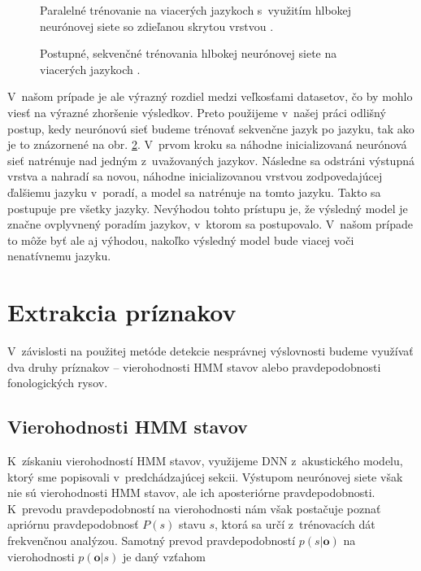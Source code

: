 \begin{figure}[ht!]
    \centering
    
    \caption{Paralelné trénovanie na viacerých jazykoch s~využitím hlbokej neurónovej siete so zdieľanou skrytou vrstvou \cite{Huang2013}.}
    \label{fig:mll-block-softmax}
\end{figure}

\begin{figure}[ht!]
    \centering
    
    \caption{Postupné, sekvenčné trénovania hlbokej neurónovej siete na viacerých jazykoch \cite{Ghoshal2013}.}
    \label{fig:mll-hat-swap}
\end{figure}

V~našom prípade je ale výrazný rozdiel medzi veľkosťami datasetov, čo by mohlo viesť na výrazné zhoršenie výsledkov. Preto použijeme v~našej práci odlišný postup, kedy neurónovú sieť budeme trénovať sekvenčne jazyk po jazyku, tak ako je to znázornené na obr. \ref{fig:mll-hat-swap}. 
V~prvom kroku sa náhodne inicializovaná neurónová sieť natrénuje nad jedným z~uvažovaných jazykov. Následne sa odstráni výstupná vrstva a nahradí sa novou, náhodne inicializovanou vrstvou zodpovedajúcej ďalšiemu jazyku v~poradí, a model sa natrénuje na tomto jazyku. Takto sa postupuje pre všetky jazyky. Nevýhodou tohto prístupu je, že výsledný model je značne ovplyvnený poradím jazykov, v~ktorom sa postupovalo. V~našom prípade to môže byť ale aj výhodou, nakoľko výsledný model bude viacej  voči nenatívnemu jazyku.  %

\section{Extrakcia príznakov} \label{sec:capt-feature-extraction}

V~závislosti na použitej metóde detekcie nesprávnej výslovnosti budeme využívať dva druhy príznakov -- vierohodnosti HMM stavov alebo pravdepodobnosti fonologických rysov. 

\subsection{Vierohodnosti HMM stavov} \label{sec:hmm-likelihoods}

K~získaniu vierohodností HMM stavov, využijeme DNN z~akustického modelu, ktorý sme popisovali v~predchádzajúcej sekcii. Výstupom neurónovej siete však nie sú vierohodnosti HMM stavov, ale ich aposteriórne pravdepodobnosti. K~prevodu pravdepodobností na vierohodnosti nám však postačuje poznať apriórnu pravdepodobnosť $P(s)$ stavu $s$, ktorá sa určí z~trénovacích dát frekvenčnou analýzou. Samotný prevod pravdepodobností $p(s|\bm{o})$ na vierohodnosti $p(\bm{o}|s)$ je daný vzťahom

